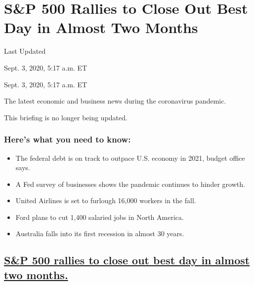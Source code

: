 \hypertarget{sp-500-rallies-to-close-out-best-day-in-almost-two-months}{%
\section{S\&P 500 Rallies to Close Out Best Day in Almost Two
Months}\label{sp-500-rallies-to-close-out-best-day-in-almost-two-months}}

Last Updated

Sept. 3, 2020, 5:17 a.m. ET

Sept. 3, 2020, 5:17 a.m. ET

The latest economic and business news during the coronavirus pandemic.

This briefing is no longer being updated.

\hypertarget{heres-what-you-need-to-know}{%
\subsubsection{Here's what you need to
know:}\label{heres-what-you-need-to-know}}

\begin{itemize}
\item
  \protect\hyperlink{the-federal-debt-is-on-track-to-outpace-us-economy-in-2021-budget-office-says}{}

  The federal debt is on track to outpace U.S. economy in 2021, budget
  office says.
\item
  \protect\hyperlink{a-fed-survey-of-businesses-shows-the-pandemic-continues-to-hinder-growth}{}

  A Fed survey of businesses shows the pandemic continues to hinder
  growth.
\item
  \protect\hyperlink{united-airlines-is-set-to-furlough-16000-workers-in-the-fall}{}

  United Airlines is set to furlough 16,000 workers in the fall.
\item
  \protect\hyperlink{ford-plans-to-cut-1400-salaried-jobs-in-north-america}{}

  Ford plans to cut 1,400 salaried jobs in North America.
\item
  \protect\hyperlink{australia-falls-into-its-first-recession-in-almost-30-years}{}

  Australia falls into its first recession in almost 30 years.
\end{itemize}

\hypertarget{sp-500-rallies-to-close-out-best-day-in-almost-two-months-1}{%
\subsection{\texorpdfstring{\protect\hyperlink{sp-500-rallies-to-close-out-best-day-in-almost-two-months}{S\&P
500 rallies to close out best day in almost two
months.}}{S\&P 500 rallies to close out best day in almost two months.}}\label{sp-500-rallies-to-close-out-best-day-in-almost-two-months-1}}

